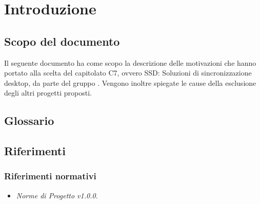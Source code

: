 \section{Introduzione}

\subsection{Scopo del documento}
Il seguente documento ha come scopo la descrizione delle motivazioni che hanno
portato alla scelta del capitolato C7, ovvero SSD: Soluzioni di sincronizzazione desktop, da parte del gruppo \gruppo{}. Vengono inoltre spiegate le cause della esclusione degli altri progetti proposti.
\subsection{Glossario}

\subsection{Riferimenti}
\subsubsection{Riferimenti normativi}
\begin{itemize}
\item \textit{Norme di Progetto v1.0.0.}
\end{itemize}
